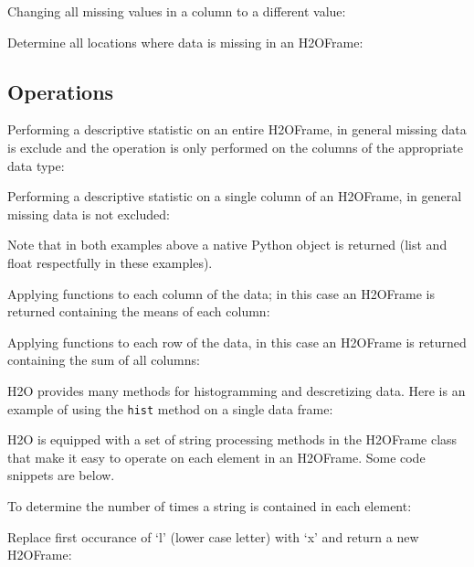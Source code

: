 Changing all missing values in a column to a different value:


Determine all locations where data is missing in an H2OFrame:


\subsection{Operations}
Performing a descriptive statistic on an entire H2OFrame, in general missing data is exclude
and the operation is only performed on the columns of the appropriate data type:


Performing a descriptive statistic on a single column of an H2OFrame, in general missing data is
not excluded:


Note that in both examples above a native Python object is returned (list and float respectfully
in these examples).

Applying functions to each column of the data;
in this case an H2OFrame is returned containing the means of each column:


Applying functions to each row of the data,
in this case an H2OFrame is returned containing the sum of all columns:


H2O provides many methods for histogramming and descretizing data.
Here is an example of using the {\texttt{hist}} method on a single data frame:


H2O is equipped with a set of string processing methods in the H2OFrame class
that make it easy to operate on each element in an H2OFrame.  Some code snippets are below.

To determine the number of times a string is contained in each element:


Replace first occurance of `l' (lower case letter) with `x' and return a new H2OFrame:


